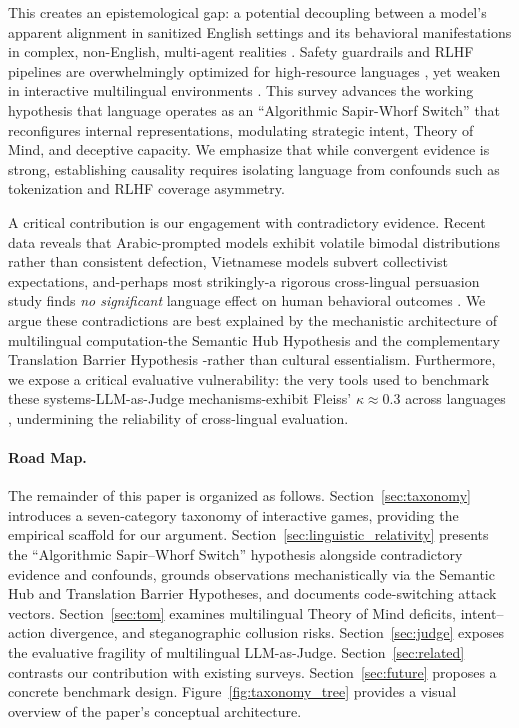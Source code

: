 \documentclass[11pt]{article}
\begin{document}
This creates an epistemological gap: a potential decoupling between a model's apparent alignment in sanitized English settings and its behavioral manifestations in complex, non-English, multi-agent realities \citep{martinez2024algorithmictrading}. Safety guardrails and RLHF pipelines \citep{ouyang2022training} are overwhelmingly optimized for high-resource languages \citep{repello2024multilingualguardrails, bai2022constitutional}, yet weaken in interactive multilingual environments \citep{peng2024jailbreaking, yong2024lowresource}. This survey advances the working hypothesis that language operates as an ``Algorithmic Sapir-Whorf Switch'' \citep{wang2025babel} that reconfigures internal representations, modulating strategic intent, Theory of Mind, and deceptive capacity. We emphasize that while convergent evidence is strong, establishing causality requires isolating language from confounds such as tokenization and RLHF coverage asymmetry.

A critical contribution is our engagement with contradictory evidence. Recent data reveals that Arabic-prompted models exhibit volatile bimodal distributions rather than consistent defection, Vietnamese models subvert collectivist expectations, and-perhaps most strikingly-a rigorous cross-lingual persuasion study finds \textit{no significant} language effect on human behavioral outcomes \citep{arango2024persuasion}. We argue these contradictions are best explained by the mechanistic architecture of multilingual computation-the Semantic Hub Hypothesis \citep{wu2024semantichub} and the complementary Translation Barrier Hypothesis \citep{bafna2025translationbarrier}-rather than cultural essentialism. Furthermore, we expose a critical evaluative vulnerability: the very tools used to benchmark these systems-LLM-as-Judge mechanisms-exhibit Fleiss' $\kappa \approx 0.3$ across languages \citep{fu2025multilingualjudge}, undermining the reliability of cross-lingual evaluation.

\paragraph{Road Map.} The remainder of this paper is organized as follows. Section~\ref{sec:taxonomy} introduces a seven-category taxonomy of interactive games, providing the empirical scaffold for our argument. Section~\ref{sec:linguistic_relativity} presents the ``Algorithmic Sapir--Whorf Switch'' hypothesis alongside contradictory evidence and confounds, grounds observations mechanistically via the Semantic Hub and Translation Barrier Hypotheses, and documents code-switching attack vectors. Section~\ref{sec:tom} examines multilingual Theory of Mind deficits, intent--action divergence, and steganographic collusion risks. Section~\ref{sec:judge} exposes the evaluative fragility of multilingual LLM-as-Judge. Section~\ref{sec:related} contrasts our contribution with existing surveys. Section~\ref{sec:future} proposes a concrete benchmark design. Figure~\ref{fig:taxonomy_tree} provides a visual overview of the paper's conceptual architecture.
\end{document}
